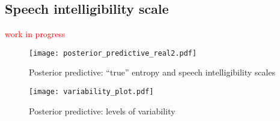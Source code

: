 \begin{comment}
	Following the successful and comprehensive analysis in \citet{vanDaal_2020} and \citet{Lesterhuis_2018}, 
	
	Notice the model depicted in panel (a) is interested on (what we can call) \textit{total effects}, i.e. the effects of the hearing characteristics, not independent from the effects of the hearing apparatus (cochlear implant or hearing aid). This is important to understand for two reasons. Since a hearing apparatus is fitted onto a child depending on aspects such as the locus and severity of his(her) hearing impairment \citep{Korver_et_al_2017}: (1) such specific children's characteristics could confound the (beneficial) effects of using specific hearing apparatuses, while (2) because children are selected from a convenient sample, not representative of their respective populations (see section \ref{s_sect:children}), the need to control for such characteristics is paramount, if we seek to obtain effects that can generalize better and beyond our sample\footnote{follow the \textit{notes} folder, to see a graphical though experiment.}.
	
	Considering the previous, we propose the model depicted in panel (b), where we control for the possible confounding variables etiology ($E_{i}$), \textcolor{blue}{as a proxy of locus}, and unaided PTA ($PTA_{i}$), as a proxy for hearing impairment severity. In that sense, the model would estimate (what we can call) the \textit{direct effects} of the hearing apparatus, independent of the children's characteristics.
\end{comment}
%
%
\subsection{Speech intelligibility scale} \label{sS:results_scales}
%
\textcolor{red}{work in progress}
%
\begin{figure}[!h]
	\centering
	\texttt{[image: posterior\_predictive\_real2.pdf]}
	\caption[Posterior predictive: ``true'' entropy and intelligibility scales]{Posterior predictive: ``true'' entropy and speech intelligibility scales}
	\label{fig:predictive2}
\end{figure}
%
\begin{figure}[!h]
	\centering
	\texttt{[image: variability\_plot.pdf]}
	\caption[Posterior predictive: levels of variability]{Posterior predictive: levels of variability}
	\label{fig:variability}
\end{figure}
%
%
